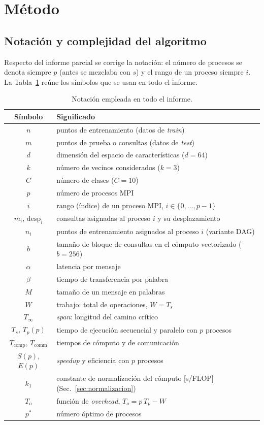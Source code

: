 \documentclass[11pt,a4paper]{article}
\newcommand{\Tcomp}{T_{\text{comp}}}
\newcommand{\Tcomm}{T_{\text{comm}}}
\begin{document}
\section{Método}

\subsection{Notación y complejidad del algoritmo}
Respecto del informe parcial se corrige la notación: el número de procesos se denota siempre $p$
(antes se mezclaba con $s$) y el rango de un proceso siempre $i$. La Tabla~\ref{tab:notacion} reúne
los símbolos que se usan en todo el informe.

\begin{table}[H]
\centering
\caption{Notación empleada en todo el informe.}
\label{tab:notacion}
\begin{tabular}{cl}
\toprule
\textbf{Símbolo} & \textbf{Significado}\\
\midrule
$n$ & puntos de entrenamiento (datos de \emph{train})\\
$m$ & puntos de prueba o consultas (datos de \emph{test})\\
$d$ & dimensión del espacio de características ($d=64$)\\
$k$ & número de vecinos considerados ($k=3$)\\
$C$ & número de clases ($C=10$)\\
$p$ & número de procesos MPI\\
$i$ & rango (índice) de un proceso MPI, $i\in\{0,\dots,p-1\}$\\
$m_i$, $\mathrm{desp}_i$ & consultas asignadas al proceso $i$ y su desplazamiento\\
$n_i$ & puntos de entrenamiento asignados al proceso $i$ (variante DAG)\\
$b$ & tamaño de bloque de consultas en el cómputo vectorizado ($b=256$)\\
$\alpha$ & latencia por mensaje\\
$\beta$ & tiempo de transferencia por palabra\\
$M$ & tamaño de un mensaje en palabras\\
$W$ & trabajo: total de operaciones, $W=T_s$\\
$T_\infty$ & \emph{span}: longitud del camino crítico\\
$T_s$, $T_p(p)$ & tiempo de ejecución secuencial y paralelo con $p$ procesos\\
$\Tcomp$, $\Tcomm$ & tiempos de cómputo y de comunicación\\
$S(p)$, $E(p)$ & \emph{speedup} y eficiencia con $p$ procesos\\
$k_1$ & constante de normalización del cómputo [s/FLOP] (Sec.~\ref{sec:normalizacion})\\
$T_o$ & función de \emph{overhead}, $T_o=p\,T_p-W$~\cite{fiestasU62}\\
$p^*$ & número óptimo de procesos\\
\bottomrule
\end{tabular}
\end{table}
\end{document}
